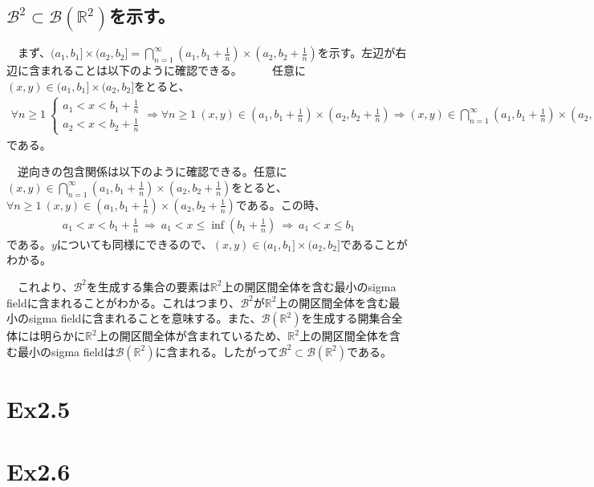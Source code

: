 \documentclass{article}
\begin{document}
\subsection{$\mathcal{B}^2 \subset \mathcal{B} \left(\mathbb{R}^2 \right)$を示す。}
　まず、$(a_1, b_1] \times(a_2,b_2] = \bigcap_{n=1}^{\infty} (a_1, b_1+\frac{1}{n}) \times(a_2, b_2+\frac{1}{n})$を示す。左辺が右辺に含まれることは以下のように確認できる。
　
　任意に$(x,y) \in (a_1, b_1] \times(a_2,b_2]$をとると、
\begin{align*}
	\forall n\geq1\ \begin{cases}
	a_1 < x < b_1 + \frac{1}{n}\\
	a_2 < x < b_2 + \frac{1}{n}
	\end{cases}
	\Rightarrow
	\forall n\geq1\ (x,y)\in (a_1, b_1+\frac{1}{n})\times(a_2,b_2+\frac{1}{n})
	\Rightarrow
	(x, y)\in \bigcap_{n=1}^{\infty} (a_1, b_1+\frac{1}{n}) \times(a_2, b_2+\frac{1}{n})
\end{align*}
である。

　逆向きの包含関係は以下のように確認できる。任意に$(x,y) \in \bigcap_{n=1}^{\infty} (a_1, b_1+\frac{1}{n}) \times(a_2, b_2+\frac{1}{n})$をとると、$\forall n\geq1\ (x,y)\in (a_1, b_1+\frac{1}{n}) \times(a_2, b_2+\frac{1}{n})$である。この時、
\begin{align*}
	a_1 <x< b_1+\frac{1}{n}\ \Rightarrow\ a_1 < x \leq \inf \left(b_1 + \frac{1}{n}\right)\ \Rightarrow\ a_1 < x \leq b_1
\end{align*}
である。$y$についても同様にできるので、$(x,y) \in (a_1, b_1] \times(a_2,b_2]$であることがわかる。

　これより、$\mathcal{B}^2$を生成する集合の要素は$\mathbb{R}^2$上の開区間全体を含む最小のsigma fieldに含まれることがわかる。これはつまり、$\mathcal{B}^2$が$\mathbb{R}^2$上の開区間全体を含む最小のsigma fieldに含まれることを意味する。また、$\mathcal{B} \left(\mathbb{R}^2 \right)$を生成する開集合全体には明らかに$\mathbb{R}^2$上の開区間全体が含まれているため、$\mathbb{R}^2$上の開区間全体を含む最小のsigma fieldは$\mathcal{B} \left(\mathbb{R}^2 \right)$に含まれる。したがって$\mathcal{B}^2 \subset \mathcal{B} \left(\mathbb{R}^2 \right)$である。



\section{Ex2.5}

\section{Ex2.6}
\end{document}
